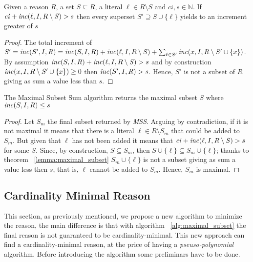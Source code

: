 \begin{lemma}
    \label{lemma:maximal_subset}
    Given a reason $R$, a set $S \subseteq R$, a literal $\ell \in R \setminus S$
    and $\mathit{ci},s \in \mathbb{N}$.
    If $\mathit{ci} +  \mathit{inc}(\ell,I,R \setminus \mathit{S}) > s$
    then every superset  $S' \supseteq S \cup \{\ell\}$ yields to 
    an increment greater of $s$
\end{lemma}

\begin{proof}
    The total increment of $S' = \mathit{inc}(S',I,R) = \mathit{inc}(S,I,R) + \mathit{inc}(\ell,I,R \setminus \mathit{S}) + 
    \sum_{\ell \in S'} \mathit{inc}(x, I, R \setminus S' \cup \{x\})$.
    By assumption $\mathit{inc}(S,I,R) + \mathit{inc}(\ell,I,R \setminus \mathit{S}) > s$  and  by construction $\mathit{inc}(x, I, R \setminus S' \cup \{x\}) \ge 0$ then 
    $\mathit{inc}(S',I,R) > s$.
    Hence, $S'$ is not a subset of $R$ giving as sum a value less than $s$.

\end{proof}

\begin{theorem}
    The Maximal Subset Sum algorithm returns the maximal subset $S$ where $\mathit{inc}(S,I,R) \le s$
\end{theorem}

\begin{proof}
    Let $S_m$ the final subset returned by \textit{MSS}.
    Arguing by contradiction, if it is not maximal 
    it means that there is a literal $\ell \in R \setminus S_m$ that could be
    added to $S_m$.
    But given that $\ell$ has not been added it means that $\mathit{ci} +  \mathit{inc}(\ell,I,R \setminus \mathit{S}) > s$
    for some $S$.
    Since, by construction, $S \subseteq S_m$, then $S \cup \{\ell\} \subseteq S_m \cup \{\ell\}$;
    thanks to theorem ~\ref{lemma:maximal_subset} $S_m \cup \{\ell\}$
    is not a subset giving as sum a value less then $s$, that is, $\ell$ cannot be 
    added to $S_m$.
    Hence, $S_m$ is maximal.
\end{proof}


\subsection{Cardinality Minimal Reason}
\label{subsec:cardinality_minimal_reason}

This section, as previously mentioned, we propose a new algorithm to minimize the reason,
the main difference is that with algorithm ~\ref{alg:maximal_subset} the final reason 
is not guaranteed to be cardinality-minimal.
This new approach can find a cardinality-minimal reason, at the price of 
having a \textit{pseuso-polynomial} algorithm.
Before introducing the algorithm some preliminars have to be done.

